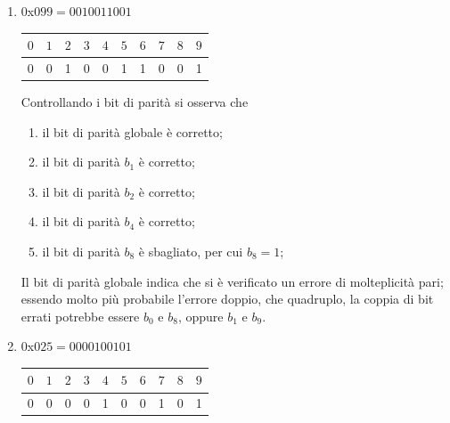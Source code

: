 \documentclass[a4paper]{extarticle}
\renewcommand\arraystretch{}
\begin{document}
\begin{enumerate}
    \item $0$x$099 = 00 1001 1001$

    \noindent
    \begin{table}[H]
    \setlength{\tabcolsep}{4pt}
    \renewcommand{\arraystretch}{1}
    \centering
    \begin{tabular}{|c|c|c|c|c|c|c|c|c|c|}
        \hline
        $0$ & $1$ & $2$ & $3$ & $4$ & $5$ & $6$ & $7$ & $8$ & $9$\\
        \hline
        \cellcolor{orange!75!white}0 & \cellcolor{orange!25!white}0 &\cellcolor{orange!25!white}1 & 0 & \cellcolor{orange!25!white}0 & 1 & 1 & 0 & \cellcolor{orange!25!white}0 & 1\\
        \hline
    \end{tabular}
    \end{table}

    \vspace{1em}
    \noindent
    Controllando i bit di parità si osserva che
    \begin{enumerate}
        \item il bit di parità globale è corretto;
        \item il bit di parità $b_1$ è corretto;
        \item il bit di parità $b_2$ è corretto;
        \item il bit di parità $b_4$ è corretto;
        \item il bit di parità $b_8$ è sbagliato, per cui $b_8=1$; 
    \end{enumerate}
    Il bit di parità globale indica che si è verificato un errore di molteplicità pari; essendo molto più probabile l'errore doppio, che quadruplo, la coppia di bit errati potrebbe essere $b_0$ e $b_8$, oppure $b_1$ e $b_9$.

    \item $0$x$025 = 00 0010 0101$

    \noindent
    \begin{table}[H]
    \setlength{\tabcolsep}{4pt}
    \renewcommand{\arraystretch}{1}
    \centering
    \begin{tabular}{|c|c|c|c|c|c|c|c|c|c|}
        \hline
        $0$ & $1$ & $2$ & $3$ & $4$ & $5$ & $6$ & $7$ & $8$ & $9$\\
        \hline
        \cellcolor{orange!75!white}0 & \cellcolor{orange!25!white}0 &\cellcolor{orange!25!white}0 & 0 & \cellcolor{orange!25!white}1 & 0 & 0 & 1 & \cellcolor{orange!25!white}0 & 1\\
        \hline
    \end{tabular}
    \end{table}


\end{enumerate}
\end{document}
